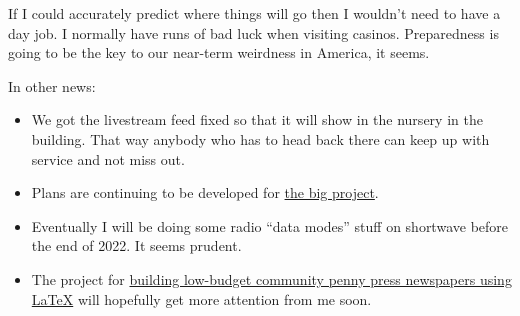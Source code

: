 If I could accurately predict where things will go then I wouldn't need
to have a day job. I normally have runs of bad luck when visiting
casinos. Preparedness is going to be the key to our near-term weirdness
in America, it seems.

In other news:

\begin{itemize}
\tightlist
\item
  We got the livestream feed fixed so that it will show in the nursery
  in the building. That way anybody who has to head back there can keep
  up with service and not miss out.
\item
  Plans are continuing to be developed for
  \href{https://www.niddk.nih.gov/bwp}{the big project}.
\item
  Eventually I will be doing some radio ``data modes'' stuff on
  shortwave before the end of 2022. It seems prudent.\\
\item
  The project for
  \href{https://code.launchpad.net/~skellat/+git/auto-newspaper}{building
  low-budget community penny press newspapers using LaTeX} will
  hopefully get more attention from me soon.
\end{itemize}

